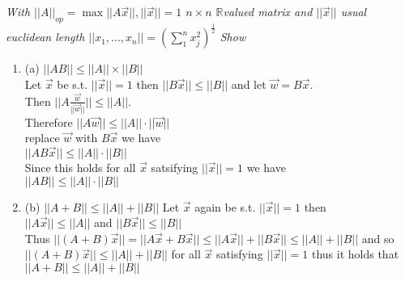 \documentclass{article}
\begin{document}
    \section{}
    \emph{With $||A||_{op} = \max||A\vec{x}||, ||\vec{x}|| = 1$ $n\times n$ $ \mathbb{R} $valued matrix  and $||\vec{x}||$ usual euclidean length $||x_1,...,x_n|| = (\sum_{1}^{n}x^2_j)^{\frac{1}{2}}$ Show}
    \begin{enumerate}
        \item (a)
            \emph{$||AB|| \le ||A|| \times ||B||$ }\\
            Let $\vec{x}$ be s.t. $||\vec{x}|| = 1$ then $||B\vec{x}|| \le ||B||$ and let $\vec{w} = B\vec{x}$.\\
            Then $||A\frac{\vec{w}}{||\vec{w}||}|| \le ||A||$.\\
            Therefore $||A\vec{w}|| \le ||A||\cdot||\vec{w}||$\\
            replace $\vec{w}$ with $B\vec{x}$ we have\\
            $||AB\vec{x}|| \le ||A|| \cdot ||B||$\\
            Since this holds for all $\vec{x}$ satsifying $||\vec{x}|| = 1$ we have\\
            $||AB|| \le ||A|| \cdot ||B||$
        \item (b)
            $||A + B|| \le ||A|| + ||B||$
            Let $\vec{x}$ again be s.t. $||\vec{x}|| = 1$ then\\
            $||A\vec{x}|| \le ||A||$ and $||B\vec{x}|| \le ||B||$\\
            Thus $||(A+B)\vec{x}|| = ||A\vec{x} + B\vec{x}|| \le ||A\vec{x}|| + ||B\vec{x}|| \le ||A|| + ||B||$
            and so $||(A+B)\vec{x}|| \le ||A|| + ||B||$ for all $\vec{x}$ satisfying $||\vec{x}|| = 1$ thus it holds that\\
            $||A+B|| \le ||A|| + ||B||$
    \end{enumerate}
\end{document}

